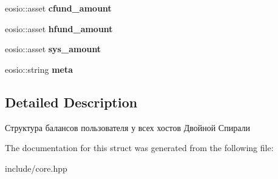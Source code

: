 \begin{DoxyCompactItemize}
\item 
\mbox{\label{structbalance_aa114410afa216d60a712fb677231ce0b}} 
eosio\+::asset {\bfseries cfund\+\_\+amount}
\item 
\mbox{\label{structbalance_ac149b98afd086a41b24b2deb1894b8ea}} 
eosio\+::asset {\bfseries hfund\+\_\+amount}
\item 
\mbox{\label{structbalance_a050e60d399f399ed44f19793778fd487}} 
eosio\+::asset {\bfseries sys\+\_\+amount}
\item 
\mbox{\label{structbalance_a70f30d92f79649b752878f9dcc61f7cf}} 
eosio\+::string {\bfseries meta}
\end{DoxyCompactItemize}


\subsection{Detailed Description}
Структура балансов пользователя у всех хостов Двойной Спирали 

The documentation for this struct was generated from the following file\+:\begin{DoxyCompactItemize}
\item 
include/core.\+hpp\end{DoxyCompactItemize}
